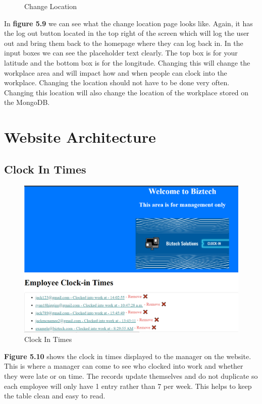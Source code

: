 \begin{figure}[!htb]
    \caption{Change Location}
    \label{fig}
\end{figure}
In \textbf{figure 5.9} we can see what the change location page looks like. Again, it has the log out button located in the top right of the screen which will log the user out and bring them back to the homepage where they can log back in. In the input boxes we can see the placeholder text clearly. The top box is for your latitude and the bottom box is for the longitude. Changing this will change the workplace area and will impact how and when people can clock into the workplace. Changing the location should not have to be done very often. Changing this location will also change the location of the workplace stored on the MongoDB.
\FloatBarrier

\section{Website Architecture}

\subsection{Clock In Times}
\begin{figure}[!htb]
    \centering
    \includegraphics[scale=0.66]{img/ClockInTimes.PNG}
    \caption{Clock In Times}
    \label{fig}
\end{figure}
\textbf{Figure 5.10} shows the clock in times displayed to the manager on the website. This is where a manager can come to see who clocked into work and whether they were late or on time. The records update themselves and do not duplicate so each employee will only have 1 entry rather than 7 per week. This helps to keep the table clean and easy to read.
\FloatBarrier

